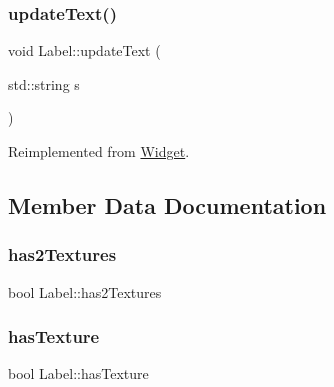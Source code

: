 \mbox{\label{class_label_a2a06e54df5c7e7aa3c7c7749fa80817c}} 
\subsubsection{\texorpdfstring{updateText()}{updateText()}}
{\footnotesize\ttfamily void Label\+::update\+Text (\begin{DoxyParamCaption}\item[{std\+::string}]{s }\end{DoxyParamCaption})\hspace{0.3cm}{\ttfamily [virtual]}}



Reimplemented from \mbox{\hyperlink{class_widget_ad8d574eab88c94919dc01a33703066b3}{Widget}}.



\subsection{Member Data Documentation}
\mbox{\label{class_label_a92252ae476418c9c7a5ed7d9f3b1e4a0}} 
\subsubsection{\texorpdfstring{has2Textures}{has2Textures}}
{\footnotesize\ttfamily bool Label\+::has2\+Textures\hspace{0.3cm}{\ttfamily [protected]}}

\mbox{\label{class_label_ac72a1cf18a57732ff75fb9f2b0cdf5dc}} 
\subsubsection{\texorpdfstring{hasTexture}{hasTexture}}
{\footnotesize\ttfamily bool Label\+::has\+Texture\hspace{0.3cm}{\ttfamily [protected]}}

\mbox{\label{class_label_a9d6d24ef859678029cbfa81e9b09bc05}} 
